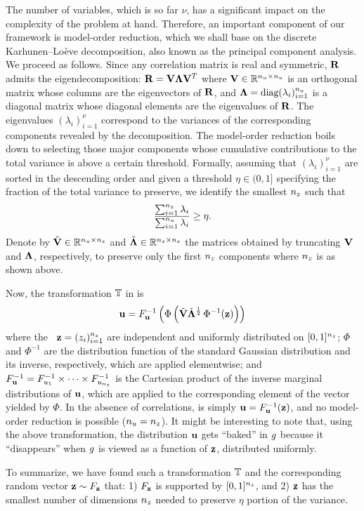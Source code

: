 The number of variables, which is so far $\nu$, has a significant impact on the
complexity of the problem at hand. Therefore, an important component of our
framework is model-order reduction, which we shall base on the discrete
Karhunen--Lo\`{e}ve decomposition, also known as the principal component
analysis. We proceed as follows. Since any correlation matrix is real and
symmetric, $\mathbf{R}$ admits the eigendecomposition: $\mathbf{R} = \mathbf{V}
\mathbf{\Lambda} \mathbf{V}^T$ where $\mathbf{V} \in \mathbb{R}^{{n_u} \times {n_u}}$ is an orthogonal
matrix whose columns are the eigenvectors of $\mathbf{R}$, and $\mathbf{\Lambda} =
\text{diag}(\lambda_i)_{i = 1}^{n_u}$ is a diagonal matrix whose diagonal elements are
the eigenvalues of $\mathbf{R}$. The eigenvalues $(\lambda_i)_{i = 1}^\nu$
correspond to the variances of the corresponding components revealed by the
decomposition. The model-order reduction boils down to selecting those major
components whose cumulative contributions to the total variance is above a
certain threshold. Formally, assuming that $(\lambda_i)_{i = 1}^\nu$ are sorted
in the descending order and given a threshold $\eta \in (0, 1]$ specifying the
fraction of the total variance to preserve, we identify the smallest ${n_z}$ such
that
\begin{equation} \elab{reduction}
  \frac{\sum_{i = 1}^\nz \lambda_i}{\sum_{i = 1}^\nu \lambda_i} \geq \eta.
\end{equation}
Denote by $\tilde{\mathbf{V}} \in \mathbb{R}^{{n_u} \times {n_z}}$ and $\tilde{\mathbf{\Lambda}}
\in\mathbb{R}^{{n_z} \times {n_z}}$ the matrices obtained by truncating $\mathbf{V}$ and
$\mathbf{\Lambda}$, respectively, to preserve only the first ${n_z}$ components where
${n_z}$ is as shown above.

Now, the transformation $\mathbb{T}$ in  is
\begin{equation} \elab{transformation-concrete}
  \vu = \distribution_\vu^{-1} \left( \Phi\left( \tilde{\m{V}} \tilde{\m{\Lambda}}^\frac{1}{2} \, \Phi^{-1}(\vz) \right) \right)
\end{equation}
where the \rvs\ $\mathbf{z} = (z_i)_{i = 1}^{n_z}$ are independent and uniformly
distributed on $[0, 1]^{n_z}$; $\Phi$ and $\Phi^{-1}$ are the distribution
function of the standard Gaussian distribution and its inverse, respectively,
which are applied elementwise; and $F_{\mathbf{u}}^{-1} =
F_{u_1}^{-1} \times \cdots \times F_{u_{n_z}}^{-1}$ is
the Cartesian product of the inverse marginal distributions of $\mathbf{u}$, which are
applied to the corresponding element of the vector yielded by $\Phi$. In the
absence of correlations,  is simply $\mathbf{u} =
F_{\mathbf{u}}^{-1}(\mathbf{z})$, and no model-order reduction is possible (${n_u} =
{n_z}$). It might be interesting to note that, using the above transformation, the
distribution $\mathbf{u}$ gets ``baked'' in $g$ because it ``disappears'' when $g$ is
viewed as a function of $\mathbf{z}$, distributed uniformly.

To summarize, we have found such a transformation $\mathbb{T}$ and the
corresponding random vector $\mathbf{z} \sim F_{\mathbf{z}}$ that: 1)
$F_{\mathbf{z}}$ is supported by $[0, 1]^{n_z}$, and 2) $\mathbf{z}$ has the smallest
number of dimensions ${n_z}$ needed to preserve $\eta$ portion of the variance.
